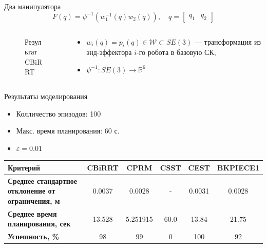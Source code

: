 \documentclass[11pt, aspectratio=169]{beamer}
\newcommand{\R}{\mathbb{R}}
\newcommand{\SE}[1]{SE(#1)}
\newcommand{\R}{\mathbb{R}}
\begin{document}
\begin{frame}{Два манипулятора}
    \begin{equation}
        F(q) = \psi^{-1}(w^{-1}_1(q)w_2(q)), \quad q = \begin{bmatrix} q_1 & q_2\end{bmatrix}
    \end{equation}
    \begin{columns}
        \begin{column}{0.55\textwidth}
            \begin{figure}
                \centering
                \caption{Результат CBiRRT}
            \end{figure}
        \end{column}
        \begin{column}{0.42\textwidth}
            \begin{itemize}
                \item $w_i(q) = p_i(q) \in \mathcal{W} \subset \SE{3}$  --- трансформация из энд-эффектора $i$-го робота в базовую СК,
                \item $\psi^{-1}: \SE{3} \rightarrow \R^6$
            \end{itemize}
        \end{column}
    \end{columns}
\end{frame}


\begin{frame}{Результаты моделирования}
    \begin{itemize}
        \item Колличество эпизодов: 100
        \item Макс. время планирования: 60 с.
        \item $\varepsilon = 0.01$
    \end{itemize}
    \begin{table}[]
        \centering
        \begin{tabular}{|p{3cm}|c|c|c|c|c|}
        \hline
            \textbf{Критерий}& \textbf{CBiRRT} & \textbf{CPRM} &\textbf{CSST} &\textbf{CEST} & \textbf{BKPIECE1}\\
            \hline
            \textbf{Среднее стандартное отклонение от ограничения, м} & 0.0037 & 0.0028 & - & 0.0031 & 0.0028\\
            \hline
            \textbf{Среднее время планирования, сек} & 13.528 & 5.251915 & 60.0 & 13.84 & 21.75\\
            \hline
            \textbf{Успешность, \%} & 98 & 99 & 0 & 100 & 92\\
            \hline
        \end{tabular}
        \label{tab:my_label}
    \end{table}
\end{frame}
\end{document}
